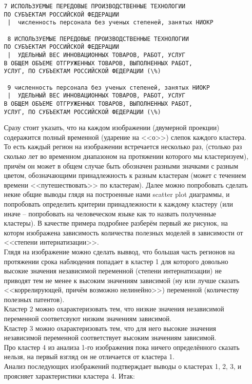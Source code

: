 \documentclass[11pt]{article}
\begin{document}
\begin{Verbatim}[commandchars=\\\{\}]
 7 ИСПОЛЬЗУЕМЫЕ ПЕРЕДОВЫЕ ПРОИЗВОДСТВЕННЫЕ ТЕХНОЛОГИИ
ПО СУБЪЕКТАМ РОССИЙСКОЙ ФЕДЕРАЦИИ 
 |  численность персонала без ученых степеней, занятых НИОКР

 8 ИСПОЛЬЗУЕМЫЕ ПЕРЕДОВЫЕ ПРОИЗВОДСТВЕННЫЕ ТЕХНОЛОГИИ
ПО СУБЪЕКТАМ РОССИЙСКОЙ ФЕДЕРАЦИИ 
 |  УДЕЛЬНЫЙ ВЕС ИННОВАЦИОННЫХ ТОВАРОВ, РАБОТ, УСЛУГ
В ОБЩЕМ ОБЪЕМЕ ОТГРУЖЕННЫХ ТОВАРОВ, ВЫПОЛНЕННЫХ РАБОТ,
УСЛУГ, ПО СУБЪЕКТАМ РОССИЙСКОЙ ФЕДЕРАЦИИ (\%)

 9 численность персонала без ученых степеней, занятых НИОКР 
 |  УДЕЛЬНЫЙ ВЕС ИННОВАЦИОННЫХ ТОВАРОВ, РАБОТ, УСЛУГ
В ОБЩЕМ ОБЪЕМЕ ОТГРУЖЕННЫХ ТОВАРОВ, ВЫПОЛНЕННЫХ РАБОТ,
УСЛУГ, ПО СУБЪЕКТАМ РОССИЙСКОЙ ФЕДЕРАЦИИ (\%)

    \end{Verbatim}

    Сразу стоит указать, что на каждом изображении (двумерной проекции)
содеражится полный временной (ударение на <<о>>) слепок каждого
кластера. То есть каждый регион на изображении встречается несколько
раз, (столько раз сколько лет во временном диапазоном на протяжении
которого мы кластеризуем), причём он может в общем случае быть обозначен
разными значками с разным цветом, обозначающими принадлежность к разным
кластерам (может с течением времени <<путешествовать>> по
кластерам). Далее можно попробовать сделать некие общие выводы глядя на
построенные нами scatter plot диаграммы, и попробовать определить
критерии принадлежности к каждому кластеру (или иначе -- попробовать на
человеческом языке как то назвать полученные кластеры). В качестве
примера подробнее разберём первый же рисунок, на которм изображена
зависимость количества полезных моделей в зависимости от
<<степени интернатизации>>. \\ Глядя на изображение
можно сделать выввод, что большая часть регионов на протяжении срока
наблюдения попадает в кластер 1 для которого довольно высокие значения
независимой переменной (степени интернатизации) не приводят тем не менее
к высоким значениям зависимой (ну или лучше сказать
<<коррелирующей, причём возможно нелинейно>>) переменной
(количеству полезных патентов). \\ Кластер 2 можно
охарактеризовать тем, что низкие значения независимой переменной
соответсвуют низким значениям зависимой. \\ Кластер 3 можно
охарактеризовать тем, что для него высокие значения независимой
переменной соответствует высоким значениям зависимой.
\\ Про кластер 4 из анализа 1-го изображения пока ничего
определённого сказать нельзя, на первый взгляд он не отличается от
кластера 1. \\ Анализ последующих изображений подтверждает
выводы о кластерах 1, 2, 3, и проясняет характеристики кластера 4. Итак:
\end{document}
